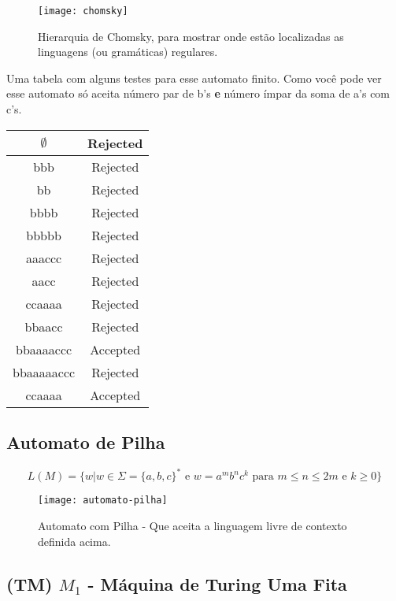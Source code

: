 \documentclass[12pt, a4paper]{article}
\begin{document}
\begin{figure}[ht]
  \centering
  \texttt{[image: chomsky]}
  \caption{Hierarquia de Chomsky, para mostrar onde estão localizadas as linguagens (ou gramáticas) regulares.}
\end{figure}


\qquad Uma tabela com alguns testes para esse automato finito. Como você pode ver esse automato só aceita número par de b's \textbf{e} número ímpar da soma de a's com c's.

\begin{tabular}{|c|c|}
  \hline $\emptyset$ & Rejected \\
  \hline bbb         & Rejected \\
  \hline bb          & Rejected \\
  \hline bbbb        & Rejected \\
  \hline bbbbb       & Rejected \\
  \hline aaaccc      & Rejected \\
  \hline aacc        & Rejected \\
  \hline ccaaaa      & Rejected \\
  \hline bbaacc      & Rejected \\
  \hline bbaaaaccc   & Accepted \\
  \hline bbaaaaaccc  & Rejected \\
  \hline ccaaaa      & Accepted \\
  \hline
\end{tabular}

\pagebreak
\subsection{Automato de Pilha}

$$ L(M)= \lbrace w \vert w \in \Sigma =  {\lbrace a,b,c \rbrace}^* \text{ e } w = {{a}^m}{{b}^n}{{c}^k} \text{ para } m \leqslant n  \leqslant 2m \text{ e } k \geqslant 0 \rbrace $$

\begin{figure}[ht]
  \centering
  \texttt{[image: automato-pilha]}
  \caption{Automato com Pilha - Que aceita a linguagem livre de contexto definida acima.}
\end{figure}

\pagebreak
\subsection{(TM) $M_1$ - Máquina de Turing Uma Fita}
\end{document}
